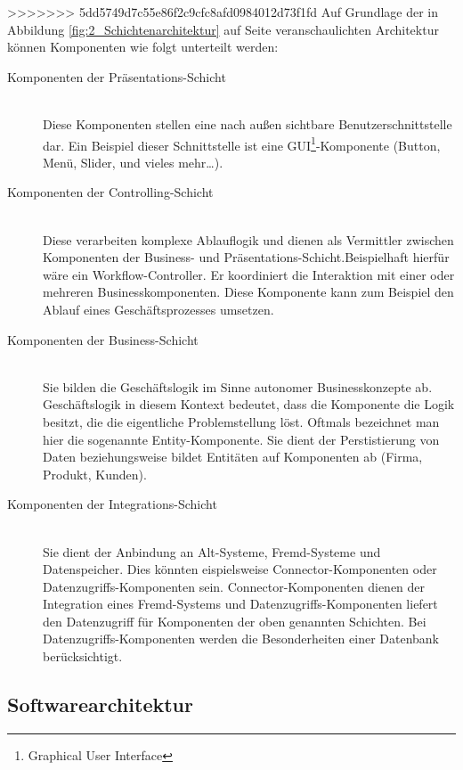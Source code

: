 >>>>>>> 5dd5749d7c55e86f2c9cfc8afd0984012d73f1fd
Auf Grundlage der in Abbildung \ref{fig:2_Schichtenarchitektur} auf Seite \pageref{fig:2_Schichtenarchitektur} veranschaulichten Architektur können Komponenten wie folgt unterteilt werden:
\begin{description}
\item[Komponenten der Präsentations-Schicht] \hfill \\
Diese Komponenten stellen eine nach außen sichtbare Benutzerschnittstelle dar. Ein Beispiel dieser Schnittstelle ist eine GUI\footnote{Graphical User Interface}-Komponente (Button, Menü, Slider, und vieles mehr\ldots).
\item[Komponenten der Controlling-Schicht] \hfill \\
Diese verarbeiten komplexe Ablauflogik und dienen als Vermittler zwischen Komponenten der Business- und Präsentations-Schicht.Beispielhaft hierfür wäre ein Workflow-Controller. Er koordiniert die Interaktion mit einer oder mehreren Businesskomponenten. Diese Komponente kann zum Beispiel den Ablauf eines Geschäftsprozesses umsetzen.
\item[Komponenten der Business-Schicht] \hfill \\
Sie bilden die Geschäftslogik im Sinne autonomer Businesskonzepte ab. Geschäftslogik in diesem Kontext bedeutet, dass die Komponente die Logik besitzt, die die eigentliche Problemstellung löst. Oftmals bezeichnet man hier die sogenannte Entity-Komponente. Sie dient der Perstistierung von Daten beziehungsweise bildet Entitäten auf Komponenten ab (Firma, Produkt, Kunden).
\item[Komponenten der Integrations-Schicht] \hfill \\
Sie dient der Anbindung an Alt-Systeme, Fremd-Systeme und Datenspeicher. Dies könnten eispielsweise Connector-Komponenten oder Datenzugriffs-Komponenten sein. Connector-Komponenten dienen der Integration eines Fremd-Systems und Datenzugriffs-Komponenten liefert den Datenzugriff für Komponenten der oben genannten Schichten. Bei Datenzugriffs-Komponenten werden die Besonderheiten einer Datenbank berücksichtigt.
\end{description}

\subsection{Softwarearchitektur}
\label{sec:2_Softwarearchitektur}

